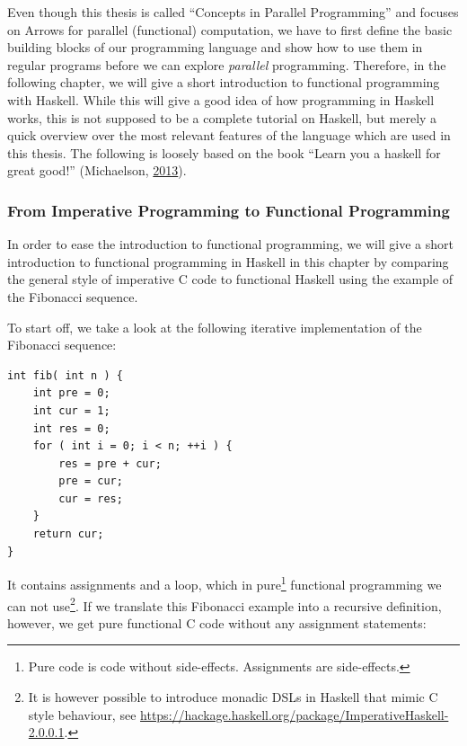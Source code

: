 \documentclass[paper=A4,twoside=true,openright,parskip=full,chapterprefix=true,headings=normal,bibliography=totoc,listof=totoc,titlepage=on,captions=tableabove,draft=false,british]{scrreprt}%
\renewcommand{\enquote}[1]{{``}#1{''}}
\begin{document}
\label{sec:shortIntroHaskell}

Even though this thesis is called
\enquote{Concepts in Parallel Programming} and focuses on Arrows for
parallel (functional) computation, we have to first define the basic
building blocks of our programming language and show how to use them in
regular programs before we can explore \emph{parallel} programming.
Therefore, in the following chapter, we will give a short introduction
to functional programming with Haskell. While this will give a good idea
of how programming in Haskell works, this is not supposed to be a
complete tutorial on Haskell, but merely a quick overview over the most
relevant features of the language which are used in this thesis. The
following is loosely based on the book
\enquote{Learn you a haskell for great good!} (Michaelson,
\protect\hyperlink{ref-learnyouahaskell}{2013}).

\hypertarget{from-imperative-programming-to-functional-programming}{%
\subsubsection{From Imperative Programming to Functional
Programming}\label{from-imperative-programming-to-functional-programming}}

In order to ease the introduction to functional programming, we will
give a short introduction to functional programming in Haskell in this
chapter by comparing the general style of imperative C code to
functional Haskell using the example of the Fibonacci sequence.

To start off, we take a look at the following iterative implementation
of the Fibonacci sequence:

\begin{center}
\lstset{language=C}
\centering
\begin{lstlisting}
int fib( int n ) {
    int pre = 0;
    int cur = 1;
    int res = 0;
    for ( int i = 0; i < n; ++i ) {
        res = pre + cur;
        pre = cur;
        cur = res;
    }
    return cur;
}
\end{lstlisting}
\end{center}
\vspace{-1\baselineskip}

It contains assignments and a loop, which in pure\footnote{Pure code is
  code without side-effects. Assignments are side-effects.} functional
programming we can not use\footnote{It is however possible to introduce
  monadic DSLs in Haskell that mimic C style behaviour, see
  \url{https://hackage.haskell.org/package/ImperativeHaskell-2.0.0.1}.}.
If we translate this Fibonacci example into a recursive definition,
however, we get pure functional C code without any assignment
statements:
\end{document}
